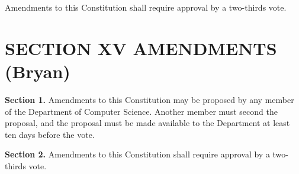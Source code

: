 \documentclass{scrartcl}
\begin{document}
Amendments to this Constitution shall require approval by a two-thirds vote.

\section*{SECTION XV AMENDMENTS (Bryan)}
{}


\textbf{Section 1.} Amendments to this Constitution may be proposed by any member of the Department of Computer Science. Another member must second the proposal, and the proposal must be made available to the Department at least ten days before the vote.

\textbf{Section 2.} Amendments to this Constitution shall require approval by a two-thirds vote.
\end{document}
